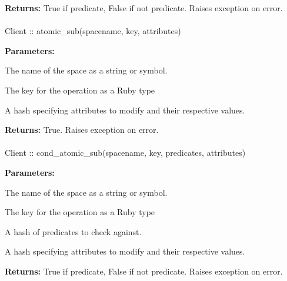 \noindent\textbf{Returns:}
True if predicate, False if not predicate.  Raises exception on error.

\paragraph{}
\label{api:ruby:atomic_sub}
\begin{rubycode}
Client :: atomic_sub(spacename, key, attributes)
\end{rubycode}


\noindent\textbf{Parameters:}
\begin{description}[labelindent=\widthof{{\code{attributes}}},leftmargin=*,noitemsep,nolistsep,align=right]
\item[\code{spacename}] The name of the space as a string or symbol.
\item[\code{key}] The key for the operation as a Ruby type
\item[\code{attributes}] A hash specifying attributes to modify and their respective values.
\end{description}

\noindent\textbf{Returns:}
True.  Raises exception on error.

\paragraph{}
\label{api:ruby:cond_atomic_sub}
\begin{rubycode}
Client :: cond_atomic_sub(spacename, key, predicates, attributes)
\end{rubycode}


\noindent\textbf{Parameters:}
\begin{description}[labelindent=\widthof{{\code{predicates}}},leftmargin=*,noitemsep,nolistsep,align=right]
\item[\code{spacename}] The name of the space as a string or symbol.
\item[\code{key}] The key for the operation as a Ruby type
\item[\code{predicates}] A hash of predicates to check against.
\item[\code{attributes}] A hash specifying attributes to modify and their respective values.
\end{description}

\noindent\textbf{Returns:}
True if predicate, False if not predicate.  Raises exception on error.

